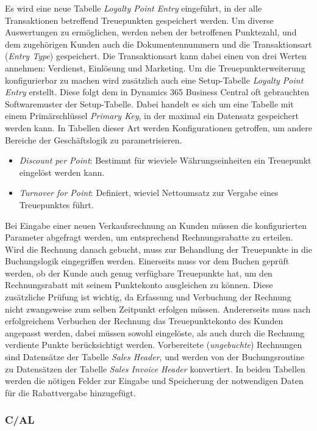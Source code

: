 Es wird eine neue Tabelle \textit{Loyalty Point Entry} eingeführt, in der alle Transaktionen betreffend Treuepunkten gespeichert werden. Um diverse Auswertungen zu ermöglichen, werden neben der betroffenen Punktezahl, und dem zugehörigen Kunden auch die Dokumentennummern und die Transaktionsart (\textit{Entry Type}) gespeichert. Die Transaktionsart kann dabei einen von drei Werten annehmen: Verdienst, Einlösung und Marketing. Um die Treuepunkterweiterung konfigurierbar zu machen wird zusätzlich auch eine Setup-Tabelle \textit{Loyalty Point Entry} erstellt. Diese folgt dem in Dynamics 365 Business Central oft gebrauchten Softwaremuster der Setup-Tabelle. Dabei handelt es sich um eine Tabelle mit einem Primärschlüssel \textit{Primary Key}, in der maximal ein Datensatz gespeichert werden kann. In Tabellen dieser Art werden Konfigurationen getroffen, um andere Bereiche der Geschäftslogik zu parametrisieren.

\begin{itemize}
	\item \textit{Discount per Point}: Bestimmt für wieviele Währungseinheiten ein Treuepunkt eingelöst werden kann.
	\item \textit{Turnover for Point}: Definiert, wieviel Nettoumsatz zur Vergabe eines Treuepunktes führt.
\end{itemize}

Bei Eingabe einer neuen Verkaufsrechnung an Kunden müssen die konfigurierten Parameter abgefragt werden, um entsprechend Rechnungsrabatte zu erteilen. Wird die Rechnung danach gebucht, muss zur Behandlung der Treuepunkte in die Buchungslogik eingegriffen werden. Einerseits muss vor dem Buchen geprüft werden, ob der Kunde auch genug verfügbare Treuepunkte hat, um den Rechnungsrabatt mit seinem Punktekonto ausgleichen zu können. Diese zusätzliche Prüfung ist wichtig, da Erfassung und Verbuchung der Rechnung nicht zwangsweise zum selben Zeitpunkt erfolgen müssen. Andererseits muss nach erfolgreichem Verbuchen der Rechnung das Treuepunktekonto des Kunden angepasst werden, dabei müssen sowohl eingelöste, als auch durch die Rechnung verdiente Punkte berücksichtigt werden. Vorbereitete (\textit{ungebuchte}) Rechnungen sind Datensätze der Tabelle \textit{Sales Header}, und werden von der Buchungsroutine zu Datensätzen der Tabelle \textit{Sales Invoice Header} konvertiert. In beiden Tabellen werden die nötigen Felder zur Eingabe und Speicherung der notwendigen Daten für die Rabattvergabe hinzugefügt.

\subsubsection{C/AL}


